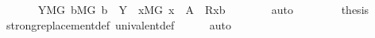 \begin{isabellebody}
\ \ \ \ \isamarkupfalse%
\ {\isachardoublequoteopen}\ {\isacharparenleft}{\kern0pt}{\isasymexists}Y{\isacharbrackleft}{\kern0pt}{\isacharhash}{\kern0pt}{\isacharhash}{\kern0pt}M{\isacharbrackleft}{\kern0pt}G{\isacharbrackright}{\kern0pt}{\isacharbrackright}{\kern0pt}{\isachardot}{\kern0pt}\ {\isasymforall}b{\isacharbrackleft}{\kern0pt}{\isacharhash}{\kern0pt}{\isacharhash}{\kern0pt}M{\isacharbrackleft}{\kern0pt}G{\isacharbrackright}{\kern0pt}{\isacharbrackright}{\kern0pt}{\isachardot}{\kern0pt}\ b\ {\isasymin}\ Y\ {\isasymlongleftrightarrow}\ {\isacharparenleft}{\kern0pt}{\isasymexists}x{\isacharbrackleft}{\kern0pt}{\isacharhash}{\kern0pt}{\isacharhash}{\kern0pt}M{\isacharbrackleft}{\kern0pt}G{\isacharbrackright}{\kern0pt}{\isacharbrackright}{\kern0pt}{\isachardot}{\kern0pt}\ x\ {\isasymin}\ A\ {\isasymand}\ {\isacharquery}{\kern0pt}R{\isacharparenleft}{\kern0pt}x{\isacharcomma}{\kern0pt}b{\isacharparenright}{\kern0pt}{\isacharparenright}{\kern0pt}{\isacharparenright}{\kern0pt}{\isachardoublequoteclose}\isanewline
\ \ \ \ \ \ \isamarkupfalse%
\ auto\isanewline
\ \ \isacommand{{\isacharbraceright}{\kern0pt}}\isamarkupfalse%
\isanewline
\ \ \isamarkupfalse%
\ \isamarkupfalse%
\ {\isacharquery}{\kern0pt}thesis\ \isamarkupfalse%
\ strong{\isacharunderscore}{\kern0pt}replacement{\isacharunderscore}{\kern0pt}def\ univalent{\isacharunderscore}{\kern0pt}def\isanewline
\ \ \ \ \isamarkupfalse%
\ auto\isanewline
{}\isamarkupfalse%
%
\endisatagproof
{\isafoldproof}%
%
\isadelimproof
\isanewline
%
\endisadelimproof
\isanewline
{}\isamarkupfalse%
\ \isanewline
%
\isadelimtheory
\isanewline
%
\endisadelimtheory
%
\isatagtheory
{}\isamarkupfalse%
%
\endisatagtheory
{\isafoldtheory}%
%
\isadelimtheory
%
\endisadelimtheory
%
\end{isabellebody}%
\endinput
